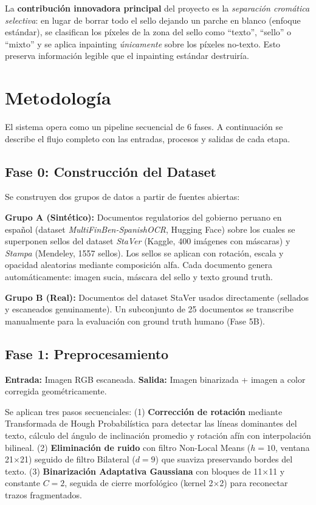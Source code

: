 \documentclass[11pt, a4paper]{article}
\begin{document}
La \textbf{contribución innovadora principal} del proyecto es la \textit{separación cromática selectiva}: en lugar de borrar todo el sello dejando un parche en blanco (enfoque estándar), se clasifican los píxeles de la zona del sello como ``texto'', ``sello'' o ``mixto'' y se aplica inpainting \textit{únicamente} sobre los píxeles no-texto. Esto preserva información legible que el inpainting estándar destruiría.

\section{Metodología}

El sistema opera como un pipeline secuencial de 6 fases. A continuación se describe el flujo completo con las entradas, procesos y salidas de cada etapa.

\subsection{Fase 0: Construcción del Dataset}

Se construyen dos grupos de datos a partir de fuentes abiertas:

\textbf{Grupo A (Sintético):} Documentos regulatorios del gobierno peruano en español (dataset \textit{MultiFinBen-SpanishOCR}, Hugging Face) sobre los cuales se superponen sellos del dataset \textit{StaVer} (Kaggle, 400 imágenes con máscaras) y \textit{Stampa} (Mendeley, 1557 sellos). Los sellos se aplican con rotación, escala y opacidad aleatorias mediante composición alfa. Cada documento genera automáticamente: imagen sucia, máscara del sello y texto ground truth.

\textbf{Grupo B (Real):} Documentos del dataset StaVer usados directamente (sellados y escaneados genuinamente). Un subconjunto de 25 documentos se transcribe manualmente para la evaluación con ground truth humano (Fase 5B).

\subsection{Fase 1: Preprocesamiento}

\textbf{Entrada:} Imagen RGB escaneada. \textbf{Salida:} Imagen binarizada + imagen a color corregida geométricamente.

Se aplican tres pasos secuenciales: (1) \textbf{Corrección de rotación} mediante Transformada de Hough Probabilística para detectar las líneas dominantes del texto, cálculo del ángulo de inclinación promedio y rotación afín con interpolación bilineal. (2) \textbf{Eliminación de ruido} con filtro Non-Local Means ($h=10$, ventana 21$\times$21) seguido de filtro Bilateral ($d=9$) que suaviza preservando bordes del texto. (3) \textbf{Binarización Adaptativa Gaussiana} con bloques de 11$\times$11 y constante $C=2$, seguida de cierre morfológico (kernel 2$\times$2) para reconectar trazos fragmentados.
\end{document}
